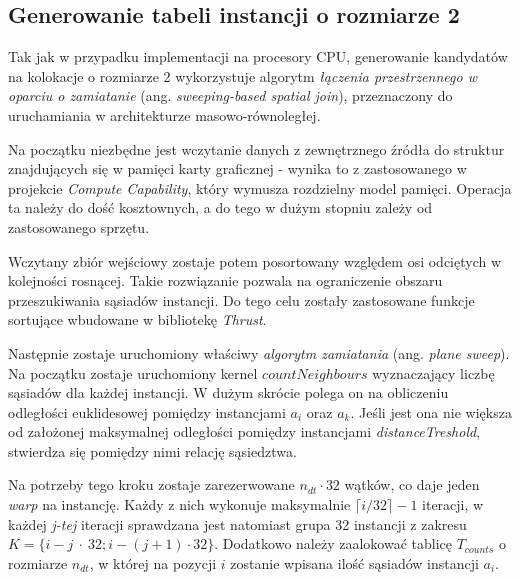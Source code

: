 \documentclass[12pt]{article}
\begin{document}


\subsection{Generowanie tabeli instancji o rozmiarze 2}

Tak jak w przypadku implementacji na procesory CPU, generowanie kandydatów na kolokacje o rozmiarze 2 wykorzystuje algorytm \textit{łączenia przestrzennego w oparciu o zamiatanie} (ang. \textit{sweeping-based spatial join}), przeznaczony do uruchamiania w architekturze masowo-równoległej. 

Na początku niezbędne jest wczytanie danych z zewnętrznego źródła do struktur znajdujących się w pamięci karty graficznej - wynika to z zastosowanego w projekcie \textit{Compute Capability}, który wymusza rozdzielny model pamięci. Operacja ta należy do dość kosztownych, a do tego w dużym stopniu zależy od zastosowanego sprzętu.

Wczytany zbiór wejściowy zostaje potem posortowany względem osi odciętych w kolejności rosnącej. Takie rozwiązanie pozwala na ograniczenie obszaru przeszukiwania sąsiadów instancji. Do tego celu zostały zastosowane funkcje sortujące wbudowane w bibliotekę \textit{Thrust}.

Następnie zostaje uruchomiony właściwy \textit{algorytm zamiatania} (ang. \textit{plane sweep}). Na początku zostaje uruchomiony kernel $ countNeighbours $ wyznaczający liczbę sąsiadów dla każdej instancji. W dużym skrócie polega on na obliczeniu odległości euklidesowej pomiędzy instancjami $ a_{i} $ oraz $ a_{k} $. Jeśli jest ona nie większa od założonej maksymalnej odległości pomiędzy instancjami \textit{distanceTreshold}, stwierdza się pomiędzy nimi relację sąsiedztwa. 

Na potrzeby tego kroku zostaje zarezerwowane $ n_{dt} \cdot 32 $ wątków, co daje jeden \textit{warp} na instancję. Każdy z nich wykonuje maksymalnie $\lceil i / 32\rceil - 1$ iteracji, w każdej \textit{j-tej} iteracji sprawdzana jest natomiast grupa 32 instancji z zakresu $ K=\{i - j~\cdot~32; i - (j + 1) \cdot 32\} $. Dodatkowo należy zaalokować tablicę $ T_{counts} $ o rozmiarze $ n_{dt} $, w której na pozycji $ i $ zostanie wpisana ilość sąsiadów instancji $ a_{i} $.
\end{document}
